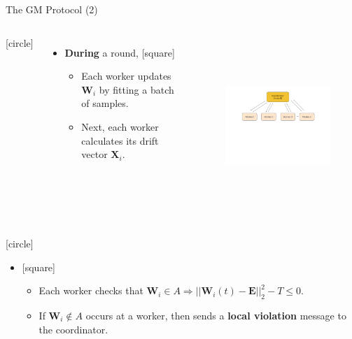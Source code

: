 \begin{frame}{The GM Protocol (2)}
    \begin{columns}
        \vspace{-3cm}
        [circle]
        \begin{itemize}
            \item{\textbf{During} a round,
            \vspace{0.2cm}
            [square]
            \begin{itemize}
                \item{Each worker updates $\pmb{W}_i$ by fitting a batch of samples.}
                \vspace{0.3cm}
                \item{Next, each worker calculates its drift vector $\pmb{X}_i$.}
            \end{itemize}
            }
        \end{itemize}
        \begin{figure}
            \includegraphics[width=8.5cm,height=6cm,center]{images/ml-fgm-2.png}\label{fig:ml-gm-2}
        \end{figure}
    \end{columns}
    \vspace{-3cm}
    [circle]
    \begin{itemize}
        \item[]{
        [square]
        \begin{itemize}
            \item{Each worker checks that $\pmb{W}_i\in A\Rightarrow||\pmb{W}_i(t)-\pmb{E}||_2^2 - T \leq 0$.}
            \vspace{0.3cm}
            \item{If $\pmb{W}_i\not\in A$ occurs at a worker, then sends a \textbf{local violation} message to the coordinator.}
        \end{itemize}
        }
    \end{itemize}
\end{frame}

